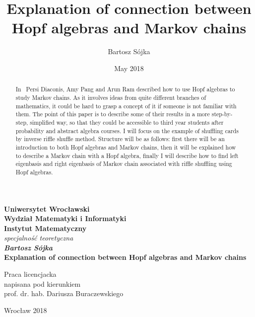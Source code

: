 \documentclass[a4paper, 12pt]{article}
\title{Explanation of connection between Hopf algebras and Markov chains}
\author{Bartosz Sójka}
\date{May 2018}
\begin{document}
\thispagestyle{empty}
\begin{center}
\textbf{\large Uniwersytet Wrocławski\\
Wydział Matematyki i Informatyki\\
Instytut Matematyczny}\\
\textit{\large specjalność teoretyczna}\\
\vspace{4cm}
\textbf{\textit{\large Bartosz Sójka}\\
\vspace{0.5cm}
{\Large Explanation of connection between Hopf algebras and Markov chains}}\\
\end{center}
\vspace{3cm}
{\large \hspace*{6.5cm}Praca licencjacka\\
\hspace*{6.5cm}napisana pod kierunkiem\\
\hspace*{6.5cm}prof. dr. hab. Dariusza Buraczewskiego }\\
\vfill
\begin{center}
{\large Wrocław 2018}\\
\end{center}
\newpage
\null
\thispagestyle{empty}
\newpage
\tableofcontents

\begin{abstract}

In~\cite{Diaconis2014} Persi Diaconis, Amy Pang and Arun Ram described how to use Hopf algebras to
study Markov chains. As it involves ideas from quite different branches of mathematics, it could be hard to
grasp a concept of it if someone is not familiar with them.
The point of this paper is to describe some of their results in a more step-by-step, simplified way,
so that they could be accessible to third year students after probability
and abstract algebra courses. I will focus on the example of shuffling cards by inverse riffle shuffle
method. Structure will be as follows: first there will be an introduction to both Hopf algebras and Markov
chains, then it will be explained how to describe a Markov chain with a Hopf algebra, finally I will
describe how to find left eigenbasis and right eigenbasis of Markov chain associated with riffle shuffling
using Hopf algebras.
\end{abstract}
\end{document}
